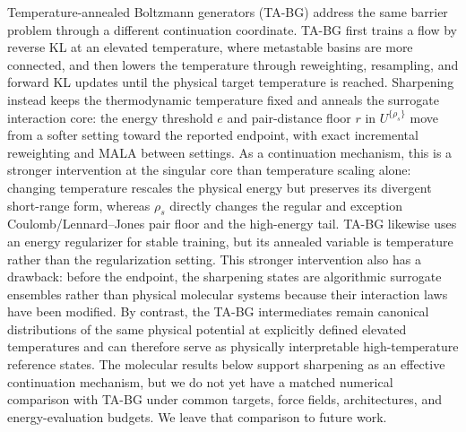 \documentclass{article}
\begin{document}
Temperature-annealed Boltzmann generators (TA-BG) \citep{schopmans2025temperature} address the same barrier problem through a different continuation coordinate. TA-BG first trains a flow by reverse KL at an elevated temperature, where metastable basins are more connected, and then lowers the temperature through reweighting, resampling, and forward KL updates until the physical target temperature is reached. Sharpening instead keeps the thermodynamic temperature fixed and anneals the surrogate interaction core: the energy threshold $e$ and pair-distance floor $r$ in $U^{\{\rho_s\}}$ move from a softer setting toward the reported endpoint, with exact incremental reweighting and MALA between settings. As a continuation mechanism, this is a stronger intervention at the singular core than temperature scaling alone: changing temperature rescales the physical energy but preserves its divergent short-range form, whereas $\rho_s$ directly changes the regular and exception Coulomb/Lennard--Jones pair floor and the high-energy tail. TA-BG likewise uses an energy regularizer for stable training, but its annealed variable is temperature rather than the regularization setting. This stronger intervention also has a drawback: before the endpoint, the sharpening states are algorithmic surrogate ensembles rather than physical molecular systems because their interaction laws have been modified. By contrast, the TA-BG intermediates remain canonical distributions of the same physical potential at explicitly defined elevated temperatures and can therefore serve as physically interpretable high-temperature reference states. The molecular results below support sharpening as an effective continuation mechanism, but we do not yet have a matched numerical comparison with TA-BG under common targets, force fields, architectures, and energy-evaluation budgets. We leave that comparison to future work.
\end{document}
